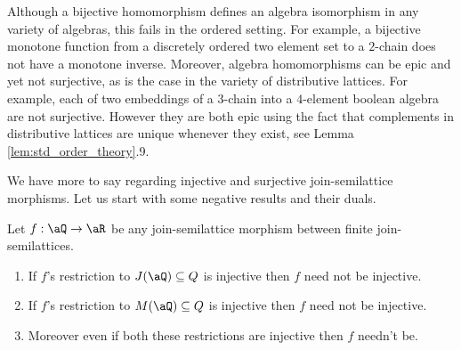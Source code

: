 \documentclass{article}
\begin{document}
\begin{note}
Although a bijective homomorphism defines an algebra isomorphism in any variety of algebras, this fails in the ordered setting. For example, a bijective monotone function from a discretely ordered two element set to a $2$-chain does not have a monotone inverse. Moreover, algebra homomorphisms can be epic and yet not surjective, as is the case in the variety of distributive lattices. For example, each of two embeddings of a $3$-chain into a $4$-element boolean algebra are not surjective. However they are both epic using the fact that complements in distributive lattices are unique whenever they exist, see Lemma \ref{lem:std_order_theory}.9. \endbox
\end{note}

We have more to say regarding injective and surjective join-semilattice morphisms. Let us start with some negative results and their duals.

\begin{lemma}
\label{lem:jsl_mor_inj_fail}
Let $f : \aQ \to \aR$ be any join-semilattice morphism between finite join-semilattices. 
\begin{enumerate}
\item
If $f$'s restriction to $J(\aQ) \subseteq Q$ is injective then $f$ need not be injective.
\item
If $f$'s restriction to $M(\aQ) \subseteq Q$ is injective then $f$ need not be injective.
\item
Moreover even if both these restrictions are injective then $f$ needn't be.

\end{enumerate}
\end{lemma}
\end{document}
